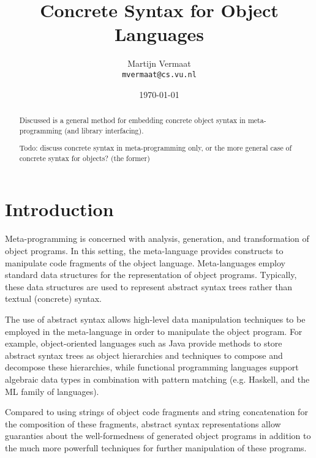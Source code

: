 \documentclass[a4paper,11pt]{article}
\title{Concrete Syntax for Object Languages}
\author{Martijn Vermaat\\
\texttt{mvermaat@cs.vu.nl}}
\date{\today}
\begin{document}
\maketitle


\lstset{
  numbers=none,
  basicstyle=\footnotesize\ttfamily,
  frame=tb,
  language=Pascal,
  captionpos=b,
  xleftmargin=1em,
  xrightmargin=1em,
  aboveskip=1em,
  belowskip=1em
}


\begin{abstract}
Discussed is a general method for embedding concrete object syntax in
meta-programming (and library interfacing).

Todo: discuss concrete syntax in meta-programming only, or the more
general case of concrete syntax for objects? (the former)
\end{abstract}


\section{Introduction}

Meta-programming is concerned with analysis, generation, and transformation
of object programs. In this setting, the meta-language provides constructs
to manipulate code fragments of the object language. Meta-languages employ
standard data structures for the representation of object programs. Typically,
these data structures are used to represent abstract syntax trees rather
than textual (concrete) syntax.

The use of abstract syntax allows high-level data manipulation techniques
to be employed in the meta-language in order to manipulate the object program.
For example, object-oriented languages such as Java provide methods to store
abstract syntax trees as object hierarchies and techniques to compose and
decompose these hierarchies, while functional programming languages support
algebraic data types in combination with pattern matching (e.g. Haskell, and
the ML family of languages).

Compared to using strings of object code fragments and string concatenation
for the composition of these fragments, abstract syntax representations allow
guaranties about the well-formedness of generated object programs in addition
to the much more powerfull techniques for further manipulation of these
programs.

\paragraph{}
\end{document}
